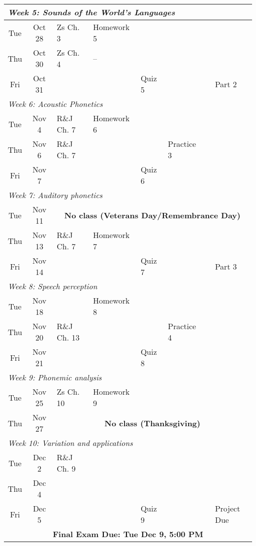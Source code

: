 \documentclass[12pt, letterpaper]{article}
\begin{document}
\begin{longtable}{|c|c|l|p{3cm}|p{1.25cm}|l|l|l|}
\multicolumn{8}{|l|}{\textit{Week 5: Sounds of the World's Languages}} \\ \hline
Tue & Oct 28  & Zs Ch. 3 & Homework 5 & & & & \\ \hline
Thu & Oct 30  & Zs Ch. 4 & -- & & & & \\ \hline
Fri & Oct 31  & & & Quiz 5 & & & Part 2 \\ \hline

\multicolumn{8}{|l|}{\textit{Week 6: Acoustic Phonetics}} \\ \hline
Tue & Nov 4   & R\&J Ch. 7 & Homework 6 & & & & \\ \hline
Thu & Nov 6   & R\&J Ch. 7 &  & & Practice 3 & & \\ \hline
Fri & Nov 7   & & & Quiz 6 & & & \\ \hline

\multicolumn{8}{|l|}{\textit{Week 7: Auditory phonetics}} \\ \hline
Tue & Nov 11  & \multicolumn{6}{c|}{\textbf{No class (Veterans Day/Remembrance Day)}} \\ \hline
Thu & Nov 13  & R\&J Ch. 7 & Homework 7 & & & & \\ \hline
Fri & Nov 14  & & & Quiz 7 & & & Part 3 \\ \hline

\multicolumn{8}{|l|}{\textit{Week 8: Speech perception}} \\ \hline
Tue & Nov 18  & & Homework 8 & & & & \\ \hline
Thu & Nov 20  & R\&J Ch. 13 & & & Practice 4 & & \\ \hline
Fri & Nov 21  & & & Quiz 8 & & & \\ \hline

\multicolumn{8}{|l|}{\textit{Week 9: Phonemic analysis }} \\ \hline
Tue & Nov 25  & Zs Ch. 10 & Homework 9 & & & & \\ \hline
Thu & Nov 27  & \multicolumn{6}{c|}{\textbf{No class (Thanksgiving)}} \\ \hline

\multicolumn{8}{|l|}{\textit{Week 10: Variation and applications}} \\ \hline
Tue & Dec 2   & R\&J Ch. 9 & & & & & \\ \hline
Thu & Dec 4   & & & &  & & \\ \hline
Fri & Dec 5   & & & Quiz 9 & & & Project Due \\ \hline

\multicolumn{8}{|c|}{\textbf{Final Exam Due: Tue Dec 9, 5:00 PM}} \\ \hline
\end{longtable}



\end{document}
